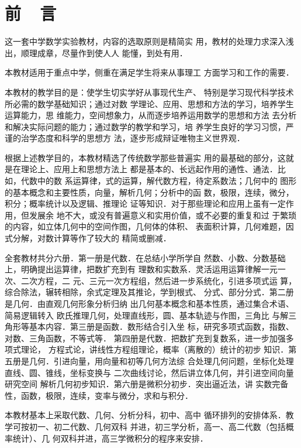 \chapter{前~~言}

这一套中学数学实验教材，内容的选取原则是精简实
用，教材的处理力求深入浅出，顺理成章，尽量作到使人人
能懂，到处有用．

    本教材适用于重点中学，侧重在满足学生将来从事理工
方面学习和工作的需要．

    本教材的教学目的是：使学生切实学好从事现代生产、
特别是学习现代科学技术所必需的数学基础知识；通过对数
学理论、应用、思想和方法的学习，培养学生运算能力，思
维能力，空间想象力，从而逐步培养运用数学的思想和方法
去分析和解决实际问题的能力；通过数学的教学和学习，培
养学生良好的学习习惯，严谨的治学态度和科学的思想方
法，逐步形成辩证唯物主义世界观．

   根据上述教学目的，本教材精选了传统数学那些普遍实
用的最基础的部分，这就是在理论上、应用上和思想方法上
都是基本的、长远起作用的通性、通法．比如，代数中的数
系运算律，式的运算，解代数方程，待定系数法；几何中的
图形的基本概念和主要性质，向量，解析几何；分析中的函
数，极限，连续，微分，积分；概率统计以及逻辑、推理论
证等知识．对于那些理论和应用上虽有一定作用，但发展余
地不大，或没有普遍意义和实用价值，或不必要的重复和过
于繁琐的内容，如立体几何中的空间作图，几何体的体积、
表面积计算，几何难题，因式分解，对数计算等作了较大的
精简或删减．

    全套教材共分六册．第一册是代数．在总结小学所学自
然数、小数、分数基础上，明确提出运算律，把数扩充到有
理数和实数系．灵活运用运算律解一元一次、二次方程，二
元、三元一次方程组，然后进一步系统化，引进多项式运
算，综合除法，辗转相除，余式定理及其推论，学到根式、
分式、部分分式．第二册是几何．由直观几何形象分析归纳
出几何基本概念和基本性质，通过集合术语、简易逻辑转入
欧氏推理几何，处理直线形，圆、基本轨迹与作图，三角比
与解三角形等基本内容．第三册是函数．数形结合引入坐
标，研究多项式函数，指数、对数、三角函数，不等式等．
第四册是代数．把数扩充到复数系，进一步加强多项式理论，
方程式论，讲线性方程组理论，概率（离散的）统计的初步
知识．第五册是几何．引进向量，用向量和初等几何方法综
合处理几何问题，坐标化处理直线、圆、锥线，坐标变换与
二次曲线讨论，然后讲立体几何，并引进空间向量研究空间
解析几何初步知识．第六册是微积分初步．突出逼近法，讲
实数完备性，函数，极限，连续，变率与微分，求和与积分．

本教材基本上采取代数、几何、分析分科，初中、高中
循环排列的安排体系．教学可按初一、初二代数、几何双科
并进，初三学分析，高一、高二代数（包括概率统计）、几
何双科并进，高三学微积分的程序来安排．

